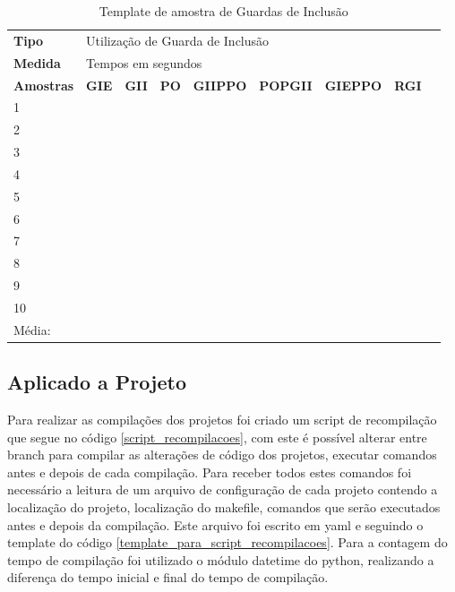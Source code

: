 \begin{table}[!ht]
\centering
\caption{Template de amostra de Guardas de Inclusão}
\label{tab:modelo_guards}
\begin{tiny}
\begin{tabular}{lp{1cm}p{1cm}p{1cm}p{1cm}p{1cm}p{1cm}p{1cm}p{1cm}}

\textbf{Tipo} & \multicolumn{7}{l}{Utilização de Guarda de Inclusão} \\
\textbf{Medida} & \multicolumn{7}{l}{Tempos em segundos } \\
\textbf{Amostras} & \textbf{GIE} & \textbf{GII} & \textbf{PO} & 
\textbf{GIIPPO} & \textbf{POPGII} & \textbf{GIEPPO} & \textbf{RGI} \\ \toprule
 1  &  &  &   &   &   &   &  \\ 
 2  &  &  &   &   &   &   &  \\ 
 3  &  &  &   &   &   &   &  \\ 
 4  &  &  &   &   &   &   &  \\ 
 5  &  &  &   &   &   &   &  \\ 
 6  &  &  &   &   &   &   &  \\ 
 7  &  &  &   &   &   &   &  \\ 
 8  &  &  &   &   &   &   &  \\ 
 9  &  &  &   &   &   &   &  \\ 
 10 &  &  &   &   &   &   &  \\ \bottomrule
 Média: & & & & &   &   &    \\ 
\end{tabular}
\end{tiny}
\end{table}


\subsection{Aplicado a Projeto}

Para realizar as compilações dos projetos foi criado um script de recompilação que
 segue no código \ref{script_recompilacoes}, com este é possível alterar entre
 branch para compilar as alterações de código dos projetos,
 executar comandos antes e depois de cada compilação.
 Para receber todos estes comandos foi necessário a leitura de um arquivo de
 configuração de cada projeto contendo a localização do projeto,
 localização do makefile, comandos que serão executados antes e depois
 da compilação.
 Este arquivo foi escrito em yaml e seguindo o template do código
 \ref{template_para_script_recompilacoes}.
Para a contagem do tempo de compilação foi utilizado o módulo datetime do python,
 realizando a diferença do tempo inicial e final do tempo de compilação.

